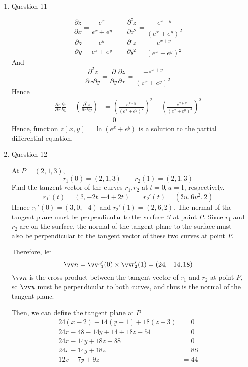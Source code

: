 \documentclass[11pt]{article}
\newcommand{\partialderiv}[2] {\frac{\partial #1}{\partial #2}}
\begin{document}
\begin{enumerate}
    \item Question 11
    
    $$
    \partialderiv{z}{x} = \frac{e^x}{e^x+e^y} \qquad \frac{\partial^2z}{\partial x^2} = \frac{e^{x+y}}{(e^x+e^y)^2}
    $$
    $$
    \partialderiv{z}{y} = \frac{e^y}{e^x+e^y} \qquad \frac{\partial^2z}{\partial y^2} = \frac{e^{x+y}}{(e^x+e^y)^2}
    $$
    And
    $$
    \frac{\partial^2z}{\partial x \partial y} = \partialderiv{}{y}\partialderiv{z}{x} = \frac{-e^{x+y}}{(e^x+e^y)^2}
    $$
    Hence
    $$
    \begin{aligned}
        \partialderiv{z}{x}\partialderiv{z}{y} - \left( \frac{\partial^2z}{\partial x \partial y} \right) &= \left(\frac{e^{x+y}}{(e^x+e^y)^2}\right)^2 - \left(\frac{-e^{x+y}}{(e^x+e^y)^2}\right)^2 \\
        &= 0
    \end{aligned}
    $$
    Hence, function $z(x,y)=\ln(e^x+e^y)$ is a solution to the partial differential equation.
    
    \item Question 12
    
    At $P=(2,1,3)$,
    $$
    r_1(0) = (2,1,3) \qquad r_2(1) = (2,1,3)
    $$
    Find the tangent vector of the curves $r_1,r_2$ at $t=0, u=1$, respectively.
    $$
    r_1'(t) = (3,-2t,-4+2t) \qquad r_2'(t) = (2u, 6u^2, 2)
    $$
    Hence $r_1'(0) = (3,0,-4)$ and $r_2'(1)=(2,6,2)$. The normal of the tangent plane must be perpendicular to the surface $S$ at point $P$. Since $r_1$ and $r_2$ are on the surface, the normal of the tangent plane to the surface must also be perpendicular to the tangent vector of these two curves at point $P$.
    
    Therefore, let 
    $$
    \vv n = \vv r_1'(0) \times \vv r_2'(1) = (24,-14,18)
    $$ 
    $\vv n$ is the cross product between the tangent vector of $r_1$ and $r_2$ at point $P$, so $\vv n$ must be perpendicular to both curves, and thus is the normal of the tangent plane.
    
    Then, we can define the tangent plane at $P$
    $$
    \begin{aligned}
        24(x-2) - 14(y-1) + 18(z-3) &= 0 \\
        24x - 48 -14y +14 + 18z - 54 &= 0 \\
        24x - 14y + 18z - 88 &= 0 \\
        24x - 14y + 18z &= 88 \\
        12x - 7y + 9z &= 44
    \end{aligned}
    $$
\end{enumerate} 
\end{document}
